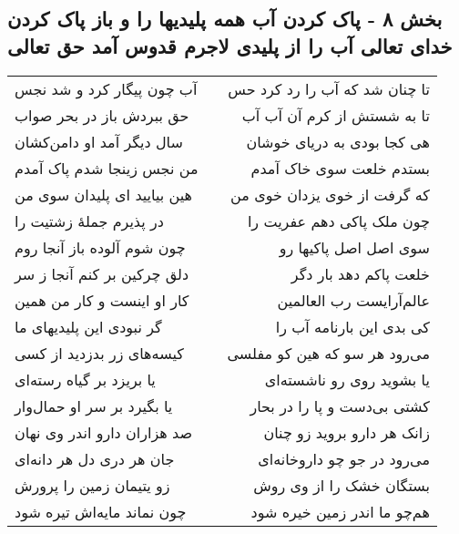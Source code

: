 \begin{center}
\section*{بخش ۸ - پاک کردن آب همه پلیدیها را و باز پاک کردن خدای تعالی آب را از پلیدی لاجرم قدوس آمد حق تعالی}
\label{sec:sh008}
\begin{longtable}{l p{0.5cm} r}
آب چون پیگار کرد و شد نجس
&&
تا چنان شد که آب را رد کرد حس
\\
حق ببردش باز در بحر صواب
&&
تا به شستش از کرم آن آب آب
\\
سال دیگر آمد او دامن‌کشان
&&
هی کجا بودی به دریای خوشان
\\
من نجس زینجا شدم پاک آمدم
&&
بستدم خلعت سوی خاک آمدم
\\
هین بیایید ای پلیدان سوی من
&&
که گرفت از خوی یزدان خوی من
\\
در پذیرم جملهٔ زشتیت را
&&
چون ملک پاکی دهم عفریت را
\\
چون شوم آلوده باز آنجا روم
&&
سوی اصل اصل پاکیها رو
\\
دلق چرکین بر کنم آنجا ز سر
&&
خلعت پاکم دهد بار دگر
\\
کار او اینست و کار من همین
&&
عالم‌آرایست رب العالمین
\\
گر نبودی این پلیدیهای ما
&&
کی بدی این بارنامه آب را
\\
کیسه‌های زر بدزدید از کسی
&&
می‌رود هر سو که هین کو مفلسی
\\
یا بریزد بر گیاه رسته‌ای
&&
یا بشوید روی رو ناشسته‌ای
\\
یا بگیرد بر سر او حمال‌وار
&&
کشتی بی‌دست و پا را در بحار
\\
صد هزاران دارو اندر وی نهان
&&
زانک هر دارو بروید زو چنان
\\
جان هر دری دل هر دانه‌ای
&&
می‌رود در جو چو داروخانه‌ای
\\
زو یتیمان زمین را پرورش
&&
بستگان خشک را از وی روش
\\
چون نماند مایه‌اش تیره شود
&&
هم‌چو ما اندر زمین خیره شود
\\
\end{longtable}
\end{center}
